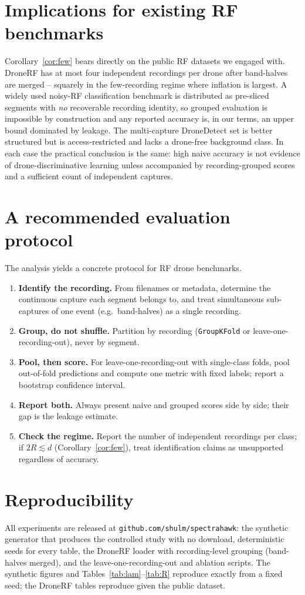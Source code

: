 \documentclass[11pt]{article}
\begin{document}
\section{Implications for existing RF benchmarks}
Corollary~\ref{cor:few} bears directly on the public RF datasets we engaged with. DroneRF has at most four independent recordings per drone after band-halves are merged -- squarely in the few-recording regime where inflation is largest. A widely used noisy-RF classification benchmark is distributed as pre-sliced segments with \emph{no} recoverable recording identity, so grouped evaluation is impossible by construction and any reported accuracy is, in our terms, an upper bound dominated by leakage. The multi-capture DroneDetect set is better structured but is access-restricted and lacks a drone-free background class. In each case the practical conclusion is the same: high naive accuracy is not evidence of drone-discriminative learning unless accompanied by recording-grouped scores and a sufficient count of independent captures.

\section{A recommended evaluation protocol}
The analysis yields a concrete protocol for RF drone benchmarks.
\begin{enumerate}
\item \textbf{Identify the recording.} From filenames or metadata, determine the continuous capture each segment belongs to, and treat simultaneous sub-captures of one event (e.g.\ band-halves) as a single recording.
\item \textbf{Group, do not shuffle.} Partition by recording (\texttt{GroupKFold} or leave-one-recording-out), never by segment.
\item \textbf{Pool, then score.} For leave-one-recording-out with single-class folds, pool out-of-fold predictions and compute one metric with fixed labels; report a bootstrap confidence interval.
\item \textbf{Report both.} Always present naive and grouped scores side by side; their gap is the leakage estimate.
\item \textbf{Check the regime.} Report the number of independent recordings per class; if $2R\lesssim d$ (Corollary~\ref{cor:few}), treat identification claims as unsupported regardless of accuracy.
\end{enumerate}

\section{Reproducibility}
All experiments are released at \texttt{github.com/shulm/spectrahawk}: the synthetic generator that produces the controlled study with no download, deterministic seeds for every table, the DroneRF loader with recording-level grouping (band-halves merged), and the leave-one-recording-out and ablation scripts. The synthetic figures and Tables~\ref{tab:lam}--\ref{tab:R} reproduce exactly from a fixed seed; the DroneRF tables reproduce given the public dataset.
\end{document}
